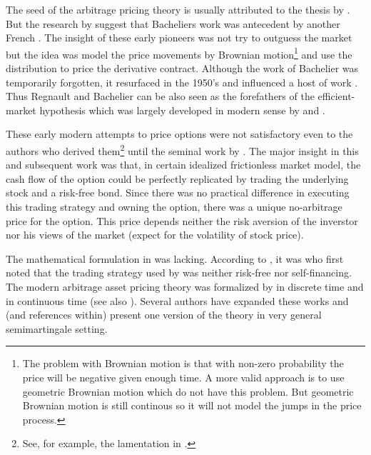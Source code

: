 The seed of the arbitrage pricing theory is usually attributed to the thesis by \textcite{bachelier1900theorie}. But the research by \textcite{jovanoviclegall2001does} suggest that Bacheliers work was antecedent by another French \textcite{regnault1863calcul}. The insight of these early pioneers was not try to outguess the market but the idea was model the price movements by Brownian motion\footnote{The problem with Brownian motion is that with non-zero probability the price will be negative given enough time. A more valid approach is to use geometric Brownian motion which do not have this problem. But geometric Brownian motion is still continous so it will not model the jumps in the price process.} and use the distribution to price the derivative contract. Although the work of Bachelier was temporarily forgotten, it resurfaced in the 1950's and influenced a host of work \parencite{samuelson1973mathematics}. Thus Regnault and Bachelier can be also seen as the forefathers of the efficient-market hypothesis which was largely developed in modern sense by \textcite{fama1965behavior} and \textcite{samuelson1965proof}.

These early modern attempts to price options were not satisfactory even to the authors who derived them\footnote{See, for example, the lamentation in \textcite{samuelson1965rational}.} until the seminal work by \textcite{blackscholes1973pricing}. The major insight in this and subsequent work was that, in certain idealized frictionless market model, the cash flow of the option could be perfectly replicated by trading the underlying stock and a risk-free bond. Since there was no practical difference in executing this trading strategy and owning the option, there was a unique no-arbitrage price for the option. This price depends neither the risk aversion of the inverstor nor his views of the market (expect for the volatility of stock price).

The mathematical formulation in \textcite{blackscholes1973pricing} was lacking. According to \textcite[p. 129]{musielarutkowski2005martingale}, it was \textcite{bergman1982pricing} who first noted that the trading strategy used by \textcite{blackscholes1973pricing} was neither risk-free nor self-financing. The modern arbitrage asset pricing theory was formalized by \textcite{harrisonkreps1979martingales} in discrete time and \textcite{harrisonpliska1981martingales} in continuous time (see also \textcite{harrisonpliska1983stochastic}). Several authors have expanded these works and \textcite{delbaenschachermayer1998fundamental} (and references within) present one version of the theory in very general semimartingale setting. 


